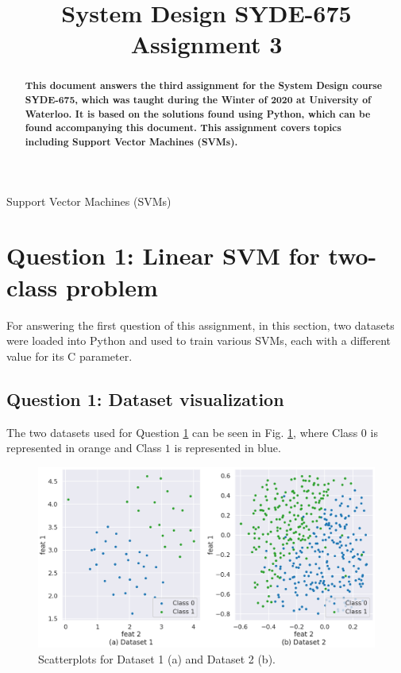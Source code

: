 \documentclass{article}
\title{System Design SYDE-675 Assignment 3}
\begin{document}
%
\maketitle

\begin{abstract}
\ninept
\textbf{
This document answers the third assignment for the System Design course SYDE-675, which was taught during the Winter of 2020 at University of Waterloo. It is based on the solutions found using Python, which can be found accompanying this document.
This assignment covers topics including Support Vector Machines (SVMs).
} 
\end{abstract}
%
\begin{keywords}
\ninept
Support Vector Machines (SVMs)
\end{keywords} 

\section{Question 1: Linear SVM for two-class problem}
\label{sec:Q1}
For answering the first question of this assignment, in this section, two datasets were loaded into Python and used to train various SVMs, each with a different value for its C parameter.

\subsection{Question 1: Dataset visualization}
\label{subsec:Q1_1}
The two datasets used for Question \ref{sec:Q1} can be seen in Fig. \ref{fig:Q1_1_Datasets}, where Class $0$ is represented in orange and Class $1$ is represented in blue.

\begin{figure}[b]
    \centering
    \includegraphics[width=\linewidth]{Img/Q1/Q1_1_Datasets.png}
    \caption{Scatterplots for Dataset 1 (a) and Dataset 2 (b).}
    \label{fig:Q1_1_Datasets}
\end{figure}
\end{document}
